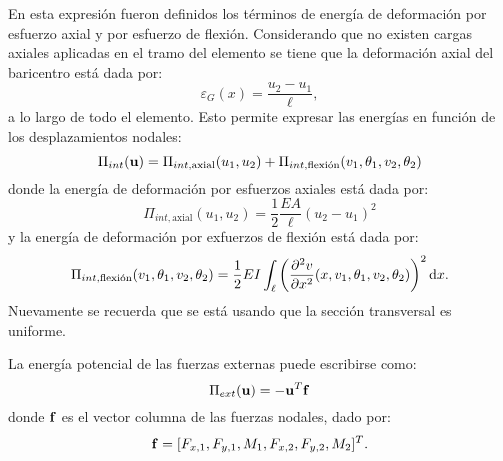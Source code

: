 En esta expresión fueron definidos los términos de energía de deformación por esfuerzo axial y por esfuerzo de flexión. %
%
Considerando que no existen cargas axiales aplicadas en el tramo del elemento se tiene que la deformación axial del baricentro está dada por:
%
\begin{equation}
\varepsilon_G(x) = \frac{u_2 - u_1}{\ell},
\end{equation}
%
a lo largo de todo el elemento. %
Esto permite expresar las energías en función de los desplazamientos nodales:
%
\begin{equation}
\Pi_{int}({\bf u}) = \Pi_{int,\text{axial}}(u_1,u_2) + \Pi_{int,\text{flexión}}(v_1,\theta_1,v_2,\theta_2)
\end{equation}
%
donde la energía de deformación por esfuerzos axiales está dada por:
%
\begin{equation}\label{eqn:Uaxial}
\Pi_{int,\text{axial}}(u_1,u_2) = \frac{1}{2} \frac{E A}{\ell} (u_2 - u_1)^2 
\end{equation}
%
y la energía de deformación por exfuerzos de flexión está dada por:
%
\begin{equation} \label{eqn:Uflex}
\Pi_{int,\text{flexión}} (v_1,\theta_1,v_2,\theta_2) = \frac{1}{2} E I \int_{\ell} \left( \frac{\partial ^2 v}{\partial x^2}(x,v_1,\theta_1,v_2,\theta_2) \right)^2{\text{d}} x .
\end{equation}
Nuevamente se recuerda que se está usando que la sección transversal es uniforme.

La energía potencial de las fuerzas externas puede escribirse como:
\begin{equation}
\Pi_{ext} ({\bf u}) = - {\bf u}^T {\bf f}
\end{equation}
%
donde ${\bf f}$ es el vector columna de las fuerzas nodales, dado por:
%
\begin{equation}
{\bf f} = [F_{x,1},F_{y,1},M_{1}, F_{x,2},F_{y,2},M_{2} ]^T.
\end{equation}


